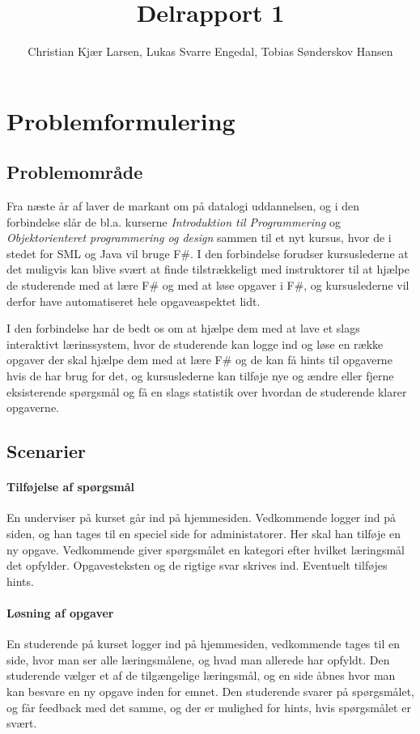 \documentclass[12pt]{article}
\title{Delrapport 1}
\author{Christian Kjær Larsen, Lukas Svarre Engedal, Tobias Sønderskov Hansen}
\begin{document}
\maketitle

\section{Problemformulering}
\subsection{Problemområde}
Fra næste år af laver de markant om på datalogi uddannelsen, og i den forbindelse slår de bl.a. kurserne \emph{Introduktion til Programmering} og \emph{Objektorienteret programmering og design} sammen til et nyt kursus, hvor de i stedet for SML og Java vil bruge F\#. 
I den forbindelse forudser kursuslederne at det muligvis kan blive svært at finde tilstrækkeligt med instruktorer til at hjælpe de studerende med at lære F\# og med at løse opgaver i F\#, og kursuslederne vil derfor have automatiseret hele opgaveaspektet lidt. 

I den forbindelse har de bedt os om at hjælpe dem med at lave et slags interaktivt lærinssystem, hvor de studerende kan logge ind og løse en række opgaver der skal hjælpe dem med at lære F\# og de kan få hints til opgaverne hvis de har brug for det, og kursuslederne kan tilføje nye og ændre eller fjerne eksisterende spørgsmål og få en slags statistik over hvordan de studerende klarer opgaverne.
\subsection{Scenarier}
\paragraph{Tilføjelse af spørgsmål}
En underviser på kurset går ind på hjemmesiden. Vedkommende logger ind på siden, og han tages til en speciel side for administatorer.
Her skal han tilføje en ny opgave. Vedkommende giver spørgsmålet en kategori efter hvilket læringsmål det opfylder. Opgavesteksten og de rigtige svar skrives ind. Eventuelt tilføjes hints.

\paragraph{Løsning af opgaver}
En studerende på kurset logger ind på hjemmesiden, vedkommende tages til en side, hvor man ser alle læringsmålene, og hvad man allerede har opfyldt. Den studerende vælger et af de tilgængelige læringsmål, og en side åbnes hvor man kan besvare en ny opgave inden for emnet. Den studerende svarer på spørgsmålet, og får feedback med det samme, og der er mulighed for hints, hvis spørgsmålet er svært.
\end{document}

